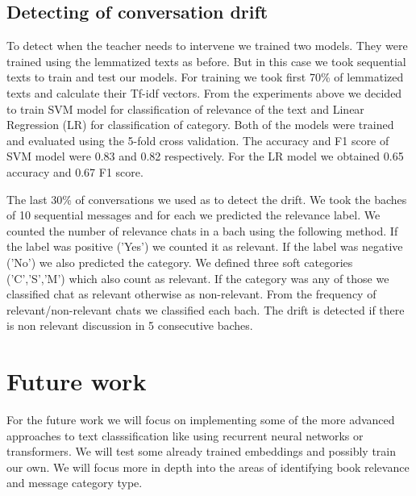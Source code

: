 \documentclass[11pt,a4paper]{article}
\begin{document}
\subsection{Detecting of conversation drift}
To detect when the teacher needs to intervene we trained two models.
They were trained using the lemmatized texts as before.
But in this case we took sequential texts to train and test our models.
For training we took first 70\% of lemmatized texts and calculate their Tf-idf vectors.
From the experiments above we decided to train SVM model for classification of relevance of the text and Linear Regression (LR) for classification of category.
Both of the models were trained and evaluated using the 5-fold cross validation.
The accuracy and F1 score of SVM model were 0.83 and 0.82 respectively.
For the LR model we obtained 0.65 accuracy and 0.67 F1 score.

The last 30\% of conversations we used as to detect the drift.
We took the baches of 10 sequential messages and for each we predicted the relevance label.
We counted the number of relevance chats in a bach using the following method.
If the label was positive ('Yes') we counted it as relevant.
If the label was negative ('No') we also predicted the category.
We defined three soft categories ('C','S','M') which also count as relevant.
If the category was any of those we classified chat as relevant otherwise as non-relevant.
From the frequency of relevant/non-relevant chats we classified each bach.
The drift is detected if there is non relevant discussion in 5 consecutive baches.

\section{Future work}

For the future work we will focus on implementing some of the more advanced approaches to text classsification like using recurrent neural networks or transformers.
We will test some already trained embeddings and possibly train our own.
We will focus more in depth into the areas of identifying book relevance and message category type.



% 


\end{document}
